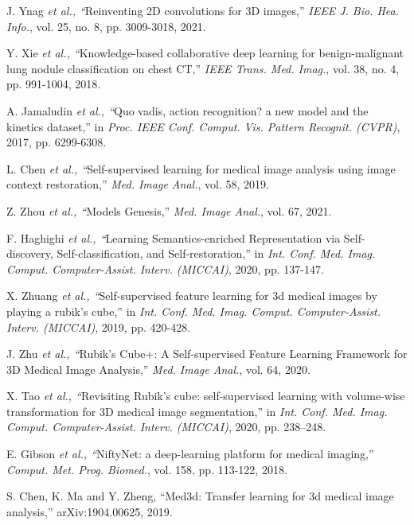 \documentclass[journal,twoside,web]{ieeecolor}
\begin{document}
\begin{thebibliography}{00}
 J. Ynag \emph{et al., ``}Reinventing 2D convolutions for 3D images,'' \emph{IEEE J. Bio. Hea. Info.}, vol. 25, no. 8,  pp. 3009-3018, 2021. 

 Y. Xie \emph{et al., ``}Knowledge-based collaborative deep learning for benign-malignant lung nodule classification on chest CT,'' \emph{IEEE Trans. Med. Imag.}, vol. 38, no. 4,  pp. 991-1004, 2018.




 A. Jamaludin \emph{et al., ``}Quo vadis, action recognition? a new model and the kinetics dataset,'' in \emph{Proc. IEEE Conf. Comput. Vis. Pattern Recognit. (CVPR)}, 2017, pp. 6299-6308.

 L. Chen \emph{et al., ``}Self-supervised learning for medical image analysis using image context restoration,'' \emph{Med. Image Anal.}, vol. 58, 2019. 


 Z. Zhou \emph{et al., ``}Models Genesis,'' \emph{Med. Image Anal.}, vol. 67, 2021. 

 F. Haghighi \emph{et al., ``}Learning Semantics-enriched Representation via Self-discovery, Self-classification, and Self-restoration,'' in \emph{Int. Conf. Med. Imag. Comput. Computer-Assist. Interv. (MICCAI)}, 2020, pp. 137-147.



 X. Zhuang \emph{et al., ``}Self-supervised feature learning for 3d medical images by playing a rubik’s cube,'' in \emph{Int. Conf. Med. Imag. Comput. Computer-Assist. Interv. (MICCAI)}, 2019, pp. 420-428.

 J. Zhu \emph{et al., ``}Rubik’s Cube+: A Self-supervised Feature Learning Framework for 3D Medical Image Analysis,'' \emph{Med. Image Anal.}, vol. 64, 2020.

 X. Tao \emph{et al., ``}Revisiting Rubik’s cube: self-supervised learning with volume-wise transformation for 3D medical image segmentation,'' in \emph{Int. Conf. Med. Imag. Comput. Computer-Assist. Interv. (MICCAI)}, 2020, pp. 238--248.

 E. Gibson \emph{et al., ``}NiftyNet: a deep-learning platform for medical imaging,'' \emph{Comput. Met. Prog. Biomed.}, vol. 158, pp. 113-122, 2018.

 S. Chen, K. Ma and Y. Zheng, ``Med3d: Transfer learning for 3d medical image analysis,'' arXiv:1904.00625, 2019.






\end{thebibliography}
\end{document}
